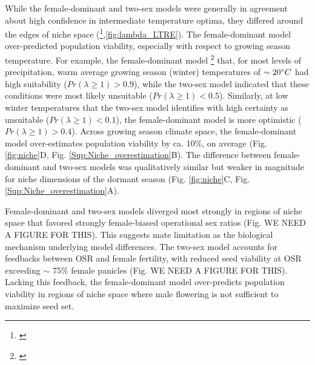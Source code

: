 \documentclass[12pt]{article}\usepackage[]{graphicx}\usepackage[dvipsnames]{xcolor}
\newcommand{\tom}[2]{{\color{red}{#1}}\footnote{\textit{\color{red}{#2}}}}
\begin{document}
While the female-dominant and two-sex models were generally in agreement about high confidence in intermediate temperature optima, they differed around the edges of niche space (\tom{Fig. \ref{fig:niche}C,D}{All multi-panel figures need letter labels.},\ref{fig:lambda_LTRE}). 
The female-dominant model over-predicted population viability, especially with respect to growing season temperature. 
For example, the female-dominant model \tom{predicted}{I think I am switching tenses. We will need to clean this up.} that, for most levels of precipitation, warm average growing season (winter) temperatures of $\sim 20\degree C$ had high suitability ($Pr(\lambda \ge 1) > 0.9$), while the two-sex model indicated that these conditions were most likely unsuitable ($Pr(\lambda \ge 1) < 0.5$). 
Similarly, at low winter temperatures that the two-sex model identifies with high certainty as unsuitable ($Pr(\lambda \ge 1) < 0.1$), the female-dominant model is more optimistic ($Pr(\lambda \ge 1) > 0.4$). 
Across growing season climate space, the female-dominant model over-estimates population viability by ca. 10\%, on average (Fig. \ref{fig:niche}D, Fig. \ref{Sup:Niche_overestimation}B). 
The difference between female-dominant and two-sex models was qualitatively similar but weaker in magnitude for niche dimensions of the dormant season (Fig. \ref{fig:niche}C, Fig. \ref{Sup:Niche_overestimation}A). 

Female-dominant and two-sex models diverged most strongly in regions of niche space that favored strongly female-biased operational sex ratios (Fig. WE NEED A FIGURE FOR THIS). 
This suggests mate limitation as the biological mechanism underlying model differences. 
The two-sex model accounts for feedbacks between OSR and female fertility, with reduced seed viability at OSR exceeding $\sim$ 75\% female panicles (Fig. WE NEED A FIGURE FOR THIS).
Lacking this feedback, the female-dominant model over-predicts population viability in regions of niche space where male flowering is not sufficient to maximize seed set. 
\end{document}
